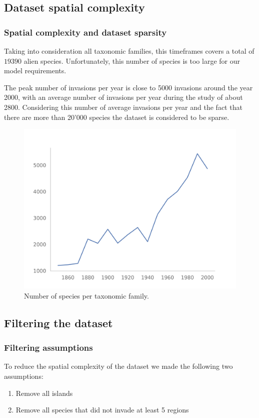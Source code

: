 \documentclass[
	11pt, %
]{beamer}
\begin{document}
\subsection{Dataset spatial complexity}
\begin{frame}
	\frametitle{Spatial complexity and dataset sparsity}
	Taking into consideration all taxonomic families, this timeframes covers a total of $19390$ alien species. Unfortunately, this number of species is too large for our model requirements.

\end{frame}

\begin{frame}

	The peak number of invasions per year is close to 5000 invasions around the year 2000, with an average number of invasions per year during the study of about 2800. Considering this number of average invasions per year and the fact that there are more than 20’000 species the dataset is considered to be sparse.

\begin{figure}
\includegraphics[width=0.5\linewidth]{invasion_per_year}
		\caption{Number of species per taxonomic family.}
	\end{figure}

\end{frame}

\subsection{Filtering the dataset}
\begin{frame}
	\frametitle{Filtering assumptions}
	To reduce the spatial complexity of the dataset we made the following two assumptions:
	\begin{enumerate}
	\item Remove all islands
	\item Remove all species that did not invade at least 5 regions
	\end{enumerate}
\end{frame}
\end{document}
